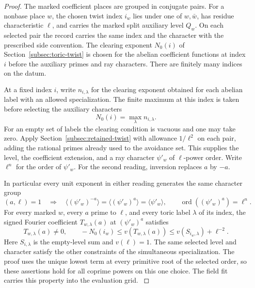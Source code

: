 \begin{proof}

The marked coefficient places are grouped in conjugate pairs.
For a nonbase place \(w\), the chosen twist index \(i_w\) lies under
one of \(w,\bar w\), has residue characteristic \(\ell\), and
carries the marked split auxiliary level \(Q_w\).
On each selected pair the record carries the same index and
the character with the prescribed side convention. The
clearing exponent \(N_0(i)\) of Section~\ref{subsec:toric-twist}
is chosen for the abelian coefficient functions at index \(i\)
before the auxiliary primes and ray characters. There are
finitely many indices on the datum.

At a fixed index \(i\), write \(n_{i,\lambda}\) for the clearing exponent obtained for each abelian label with an allowed specialization. The finite maximum at this index is taken before selecting the auxiliary characters
\[
  N_0(i)=\max_\lambda n_{i,\lambda}.
\]
For an empty set of labels the clearing condition is vacuous and one may take zero.
Apply Section~\ref{subsec:retained-twist} with allowance
\(1/\ell^2\) on each pair, adding the rational primes already
used to the avoidance set. This supplies the level, the
coefficient extension, and a ray character \(\psi'_w\) of
\(\ell\)-power order. Write \(\ell^n\) for the order of \(\psi'_w\). For the second reading, inversion replaces \(a\) by \(-a\).

In particular every unit exponent in either reading generates the same character group
\[
  (a,\ell)=1\quad\Longrightarrow\quad \langle(\psi'_w)^{-a}\rangle=\langle(\psi'_w)^a\rangle=\langle\psi'_w\rangle,\qquad \operatorname{ord}((\psi'_w)^a)=\ell^n.
\]
For every marked \(w\), every \(a\) prime to \(\ell\), and every
toric label \(\lambda\) of its index, the signed Fourier coefficient \(T_{w,\lambda}(a)\) at \((\psi'_w)^a\) satisfies
\begin{equation}\label{eq:fitted-toric-all-powers}
 T_{w,\lambda}(a)\ne0,\qquad
 -N_0(i_w)\le v(T_{w,\lambda}(a))
             \le v(S_{i_w,\lambda})+\ell^{-2}.
\end{equation}
Here \(S_{i,\lambda}\) is the empty-level sum and \(v(\ell)=1\).
The same selected level and character satisfy the other
constraints of the simultaneous specialization. The proof uses
the unique lowest term at every primitive root of the selected
order, so these assertions hold for all coprime powers on this
one choice. The field fit carries this property into the
evaluation grid. \label{cor:fitted-square-ratios-4}


\end{proof}
